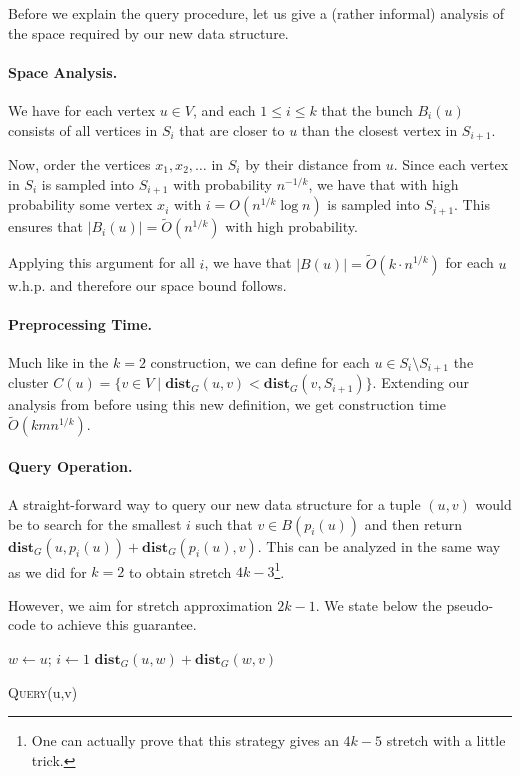 Before we explain the query procedure, let us give a (rather informal) analysis of the space required by our new data structure.

\paragraph{Space Analysis.} We have for each vertex $u \in V$, and each $1 \leq i \leq k$ that the bunch $B_i(u)$ consists of all vertices in $S_i$ that are closer to $u$ than the closest vertex in $S_{i+1}$. 

Now, order the vertices $x_1, x_2, \dots$ in $S_i$ by their distance from $u$. Since each vertex in $S_i$ is sampled into $S_{i+1}$ with probability $n^{-1/k}$, we have that with high probability some vertex $x_i$ with $i = O(n^{1/k} \log n)$ is sampled into $S_{i+1}$. This ensures that $|B_i(u)| = \tilde{O}(n^{1/k})$ with high probability. 

Applying this argument for all $i$, we have that $|B(u)| = \tilde{O}(k \cdot n^{1/k})$ for each $u$ w.h.p. and therefore our space bound follows.

\paragraph{Preprocessing Time.} Much like in the $k=2$ construction, we can define for each $u \in S_i \setminus S_{i+1}$ the cluster $C(u) = \{ v \in V \;|\; \mathbf{dist}_G(u,v) < \mathbf{dist}_G(v,S_{i+1})\}$. Extending our analysis from before using this new definition, we get construction time $\tilde{O}(kmn^{1/k})$.

\paragraph{Query Operation.} A straight-forward way to query our new data structure for a tuple $(u,v)$ would be to search for the smallest $i$ such that $v \in B(p_i(u))$ and then return $\mathbf{dist}_G(u, p_i(u)) + \mathbf{dist}_G(p_i(u), v)$. This can be analyzed in the same way as we did for $k=2$ to obtain stretch $4k-3$\footnote{One can actually prove that this strategy gives an $4k-5$ stretch with a little trick.}.

However, we aim for stretch approximation $2k-1$. We state below the pseudo-code to achieve this guarantee.

\begin{algorithm}
  \SetAlgoLined
  $w \gets u$; $i \gets 1$\;
  \Return $\mathbf{dist}_G(u,w) + \mathbf{dist}_G(w,v)$
  \caption{\textsc{Query}(u,v)}
\end{algorithm}

